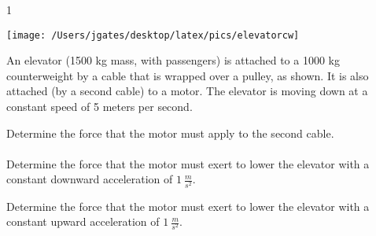 
\AddToShipoutPicture*{\BackgroundPic}

\addtocounter {ProbNum} {1}

\begin{floatingfigure}[r]{.2\textwidth}
\texttt{[image: /Users/jgates/desktop/latex/pics/elevatorcw]}
\end{floatingfigure}
 
{\bf \Large{}} An elevator (1500 kg mass, with passengers) is attached to a 1000 kg counterweight by a cable that is wrapped over a pulley, as shown.  It is also attached (by a second cable) to a motor.  The elevator is moving down at a constant speed of 5 meters per second.

\bigskip
Determine the force that the motor must apply to the second cable.
\paragraph{}
\noindent
\vfill
Determine the force that the motor must exert to lower the elevator with a constant downward acceleration of ${1~\tfrac{m}{s^2}}$.

\vfill
Determine the force that the motor must exert to lower the elevator with a constant upward acceleration of  ${1~\tfrac{m}{s^2}}$.



\vfill
\newpage
